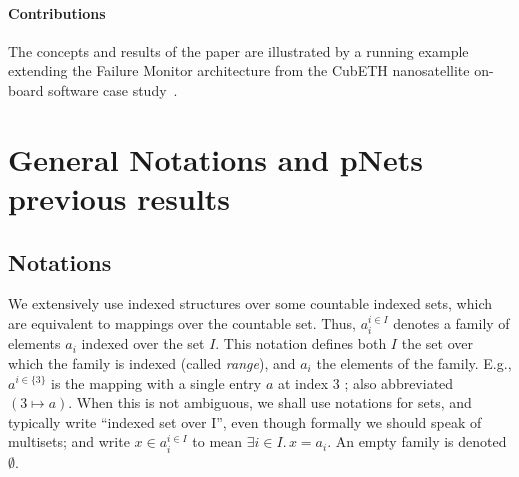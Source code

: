 \documentclass{llncs}
\newcommand{\Simon}{\\\hfill\mdash Simon}
\newcommand{\Ludo}{\\\hfill\mdash Ludo}
\newcommand{\noteIn}[2][inline,color=black!20]{\todo[#1]{{#2}}}
\newcommand{\mdash}[1][]{---#1}
\newcommand{\eg}[1][\ ]{e.g.#1}
\begin{document}
\paragraph{Contributions}



The concepts and results of the paper are illustrated by a running
example extending the Failure Monitor architecture from the CubETH
nanosatellite on-board software case study~\cite{CubETH-case-study}.


\section{General Notations and pNets previous results} 
\label{secn:preliminaries}


\subsection{Notations}
\label{secn:notations}

We extensively use indexed structures
over some countable indexed sets, which are equivalent to mappings over
the countable set. 
Thus, 
$a_i^{i\in I}$
denotes a family of elements $a_i$ indexed over the
set $I$. %
This notation defines both $I$ the set over which the family is
indexed (called \emph{range}), and $a_i$ the elements of the family.
E.g., $a^{i\in\{3\}}$ is the mapping with a single entry $a$ at index
$3$ ; also abbreviated $(3\mapsto a)$.
When this is not
ambiguous, we shall use notations for sets, and typically write
``indexed set over I'', even though formally we should speak of multisets; and
write $x\in a_i^{i\in I}$ to mean $\exists i\in I.\, x=a_i$.  An empty
family is denoted $\emptyset$.

%
\end{document}
